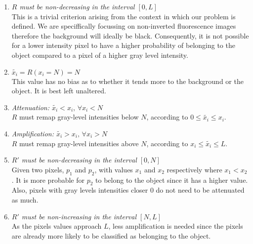 \begin{enumerate}
	\item{}
	\textit{$R$ must be non-decreasing in the interval $[0, L]$}\\
	This is a trivial criterion arising from the context in which our problem is defined. We are speciffically focussing on non-inverted fluorescence images therefore the background  will ideally be black. Consequently, it is not possible for a lower intensity pixel to have a higher probability of belonging to the object compared to a pixel of a higher gray level intensity. 
	
	\item
	\textit{$\widetilde{x_i} = R(x_i=N) = N$}\\
	This value has no bias as to whether it tends more to the background or the object. It is best left unaltered.
	
	\item
	\textit{Attenuation: $\widetilde{x_i} < x_i, \, \forall x_i<N$}\\
	$R$ must remap gray-level intensities below $N$, according to $0 \leq \widetilde{x_i} \leq x_i$.
	
	\item
	\textit{Amplification: $\widetilde{x_i} > x_i, \, \forall x_i>N$}\\
	$R$ must remap gray-level intensities above $N$, according to $x_i \leq \widetilde{x_i} \leq L$.
	
	\item
	\textit{$R'$ must be non-decreasing in the interval $[0,N]$}\\
	Given two pixels, $p_1$ and $p_2$, with values $x_1$ and $x_2$ respectively where $x_1<x_2$. It is more probable for $p_2$ to belong to the object since it has a higher value. Also, pixels with gray levels intensities closer $0$ do not need to be attenuated as much.
	
	\item
	\textit{$R'$ must be non-increasing in the interval $[N,L]$}\\
	As the pixels values approach $L$, less amplification is needed since the pixels are already more likely to be classified as belonging to the object.
\end{enumerate}


